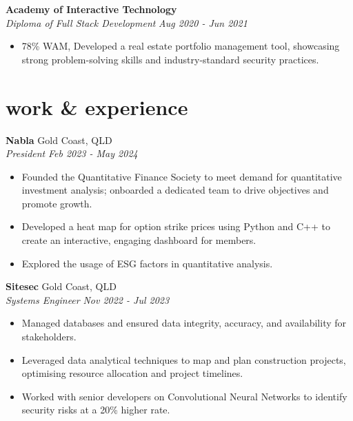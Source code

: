 \documentclass[12pt]{article}
\begin{document}
\textbf{Academy of Interactive Technology} \\
\indent \textit{\color{subtextgray}Diploma of Full Stack Development} \hfill \textit{\color{subtextgray} Aug 2020 - Jun 2021}
\begin{itemize}[topsep=0em, left=0.8em]	
  \item 78\% WAM, Developed a real estate portfolio management tool, showcasing strong problem-solving skills and industry-standard security practices.
\end{itemize}

\vspace{1em}

\section{work \& experience}

\vspace{0.20em}

\textbf{Nabla} \hfill {Gold Coast, QLD} \\
\indent \textit{\color{subtextgray}President} \hfill \textit{\color{subtextgray}Feb 2023 - May 2024}
\begin{itemize}[noitemsep, topsep=0em, left=0.8em]
  \item Founded the Quantitative Finance Society to meet demand for quantitative investment analysis; onboarded a dedicated team to drive objectives and promote growth.
  \item	Developed a heat map for option strike prices using Python and C++ to create an interactive, engaging dashboard for members.
  \item Explored the usage of ESG factors in quantitative analysis.
\end{itemize}

\textbf{Sitesec} \hfill {Gold Coast, QLD} \\
\indent \textit{\color{subtextgray}Systems Engineer} \hfill \textit{\color{subtextgray}Nov 2022 - Jul 2023}
\begin{itemize}[noitemsep, topsep=0em, left=0.8em]
  \item Managed databases and ensured data integrity, accuracy, and availability for stakeholders.
  \item	Leveraged data analytical techniques to map and plan construction projects, optimising resource allocation and project timelines.
  \item Worked with senior developers on Convolutional Neural Networks to identify security risks at a 20\% higher rate.
\end{itemize}
\end{document}
